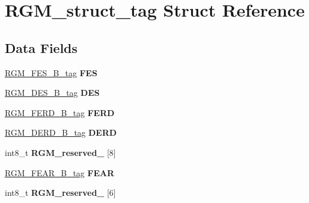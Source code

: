 \hypertarget{structRGM__struct__tag}{}\section{R\+G\+M\+\_\+struct\+\_\+tag Struct Reference}
\label{structRGM__struct__tag}
\subsection*{Data Fields}
\begin{DoxyCompactItemize}
\item 
\mbox{\label{structRGM__struct__tag_ab7734d04ffbbdbf92a6d2487d2a302b7}} 
\mbox{\hyperlink{unionRGM__FES__16B__tag}{R\+G\+M\+\_\+\+F\+E\+S\+\_\+B\+\_\+tag}} {\bfseries F\+ES}
\item 
\mbox{\label{structRGM__struct__tag_a019df4b19dac8eeff9c7e9efd25d6539}} 
\mbox{\hyperlink{unionRGM__DES__16B__tag}{R\+G\+M\+\_\+\+D\+E\+S\+\_\+B\+\_\+tag}} {\bfseries D\+ES}
\item 
\mbox{\label{structRGM__struct__tag_a1d249913fb583d66d5ff7ceae95052b5}} 
\mbox{\hyperlink{unionRGM__FERD__16B__tag}{R\+G\+M\+\_\+\+F\+E\+R\+D\+\_\+B\+\_\+tag}} {\bfseries F\+E\+RD}
\item 
\mbox{\label{structRGM__struct__tag_a249d7e11956bdd0ed0126dfe9ebe2b91}} 
\mbox{\hyperlink{unionRGM__DERD__16B__tag}{R\+G\+M\+\_\+\+D\+E\+R\+D\+\_\+B\+\_\+tag}} {\bfseries D\+E\+RD}
\item 
\mbox{\label{structRGM__struct__tag_a0224c5c57a0e01870c6557eafeb1282d}} 
int8\+\_\+t {\bfseries R\+G\+M\+\_\+reserved\+\_} \mbox{[}8\mbox{]}
\item 
\mbox{\label{structRGM__struct__tag_a607451bd0f11676e4a2ab18ba4e2f303}} 
\mbox{\hyperlink{unionRGM__FEAR__16B__tag}{R\+G\+M\+\_\+\+F\+E\+A\+R\+\_\+B\+\_\+tag}} {\bfseries F\+E\+AR}
\item 
\mbox{\label{structRGM__struct__tag_ab0dbd2ee7385a5f77fbf5ff3ffe74070}} 
int8\+\_\+t {\bfseries R\+G\+M\+\_\+reserved\+\_} \mbox{[}6\mbox{]}

\end{DoxyCompactItemize}
